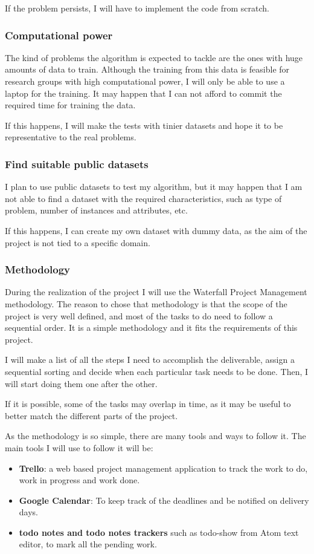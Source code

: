 \documentclass[a4paper]{article}
\begin{document}
            If the problem persists, I will have to implement the code from scratch.

            \subsubsection{Computational power}
            The kind of problems the algorithm is expected to tackle are the ones with huge amounts of data to train. Although the training from this data is feasible for research groups with high computational power, I will only be able to use a laptop for the training. It may happen that I can not afford to commit the required time for training the data.

            If this happens, I will make the tests with tinier datasets and hope it to be representative to the real problems.

            \subsubsection{Find suitable public datasets}
            I plan to use public datasets to test my algorithm, but it may happen that I am not able to find a dataset with the required characteristics, such as type of problem, number of instances and attributes, etc.

            If this happens, I can create my own dataset with dummy data, as the aim of the project is not tied to a specific domain.


        \subsubsection{Methodology}
        During the realization of the project I will use the Waterfall Project Management methodology. The reason to chose that methodology is that the scope of the project is very well defined, and most of the tasks to do need to follow a sequential order. It is a simple methodology and it fits the requirements of this project.

        I will make a list of all the steps I need to accomplish the deliverable, assign a sequential sorting and decide when each particular task needs to be done. Then, I will start doing them one after the other.

        If it is possible, some of the tasks may overlap in time, as it may be useful to better match the different parts of the project.

        As the methodology is so simple, there are many tools and ways to follow it. The main tools I will use to follow it will be:
        \begin{itemize}
            \item \textbf{Trello}: a web based project management application to track the work to do, work in progress and work done.
            \item \textbf{Google Calendar}: To keep track of the deadlines and be notified on delivery days.
            \item \textbf{todo notes and todo notes trackers} such as todo-show from Atom text editor, to mark all the pending work.
        \end{itemize}
\end{document}
